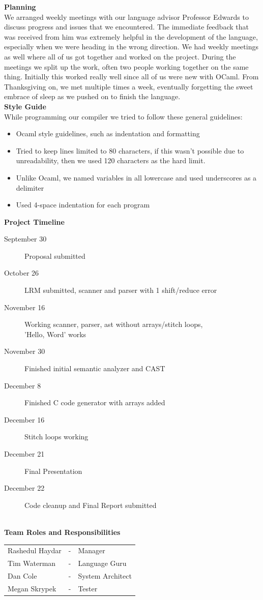 \documentclass[11pt, oneside]{article}   	%
\newcommand{\tab} {\hspace*{2em}}
\begin{document}
\Large\textbf{Planning}\\[1em]
\normalsize
\tab We arranged weekly meetings with our language advisor Professor Edwards to discuss progress and issues that we encountered. The immediate feedback that was received from him was extremely helpful in the development of the language, especially when we were heading in the wrong direction. We had weekly meetings as well where all of us got together and worked on the project. During the meetings we split up the work, often two people working together on the same thing. Initially this worked really well since all of us were new with OCaml. From Thanksgiving on, we met multiple times a week, eventually forgetting the sweet embrace of sleep as we pushed on to finish the language. \\[3em]
\Large\textbf{Style Guide}\\[1em]
\normalsize
While programming our compiler we tried to follow these general guidelines:
\begin{itemize}
  \item Ocaml style guidelines, such as indentation and formatting
  \item Tried to keep lines limited to 80 characters, if this wasn't possible due to unreadability, then we used 120 characters as the hard limit.
  \item Unlike Ocaml, we named variables in all lowercase and used underscores as a delimiter
  \item Used 4-space indentation for each program 
\end{itemize}
\newpage
\Large\textbf{Project Timeline}\\[0em]
\normalsize
\tab\begin{description}
  \item[September 30] Proposal submitted
  \item[October 26] LRM submitted, scanner and parser with 1 shift/reduce error
  \item[November 16] Working scanner, parser, ast without arrays/stitch loops, \\[.5em]'Hello, Word' works
  \item[November 30] Finished initial semantic analyzer and CAST
  \item[December 8] Finished C code generator with arrays added
  \item[December 16] Stitch loops working 
  \item[December 21] Final Presentation
  \item[December 22] Code cleanup and Final Report submitted 
\end{description}
\tab\\[3em]
\Large\textbf{Team Roles and Responsibilities}\\[1em]
\normalsize
\tab\begin{tabular}{l c l}
Rashedul Haydar & - & Manager\\
Tim Waterman & - & Language Guru\\
Dan Cole & - & System Architect\\
Megan Skrypek & - & Tester\\
\end{tabular}\\
\end{document}
